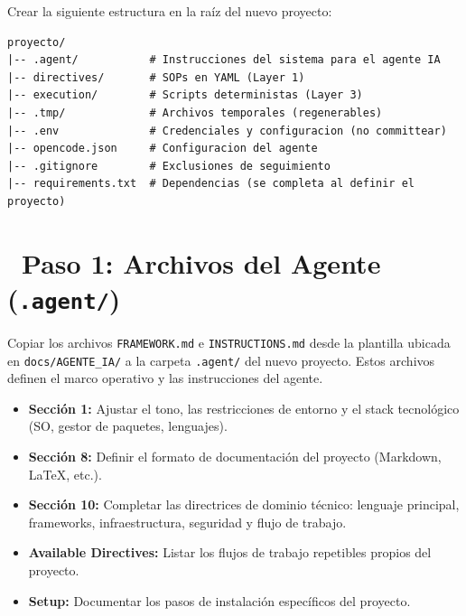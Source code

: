 \documentclass[11pt,a4paper]{article}
\newcommand{\iconotexto}[2]{\textcolor{cyanNeon}{\faIcon{#1}}~#2}
\begin{document}
Crear la siguiente estructura en la raíz del nuevo proyecto:

\begin{tcolorbox}[cajaContenido, title={Árbol de directorios}]
\begin{lstlisting}
proyecto/
|-- .agent/           # Instrucciones del sistema para el agente IA
|-- directives/       # SOPs en YAML (Layer 1)
|-- execution/        # Scripts deterministas (Layer 3)
|-- .tmp/             # Archivos temporales (regenerables)
|-- .env              # Credenciales y configuracion (no committear)
|-- opencode.json     # Configuracion del agente
|-- .gitignore        # Exclusiones de seguimiento
|-- requirements.txt  # Dependencias (se completa al definir el proyecto)
\end{lstlisting}
\end{tcolorbox}

\section[Paso 1 --- Archivos del Agente]{\iconotexto{cogs}{Paso 1: Archivos del Agente (\texttt{.agent/})}}

Copiar los archivos \texttt{FRAMEWORK.md} e \texttt{INSTRUCTIONS.md} desde la plantilla ubicada en \texttt{docs/AGENTE\_IA/} a la carpeta \texttt{.agent/} del nuevo proyecto. Estos archivos definen el marco operativo y las instrucciones del agente.

\begin{tcolorbox}[cajaContenido, title={Personalizar en \texttt{INSTRUCTIONS.md}}]
\begin{itemize}[leftmargin=*]
    \item \textbf{Sección 1:} Ajustar el tono, las restricciones de entorno y el stack tecnológico (SO, gestor de paquetes, lenguajes).
    \item \textbf{Sección 8:} Definir el formato de documentación del proyecto (Markdown, LaTeX, etc.).
    \item \textbf{Sección 10:} Completar las directrices de dominio técnico: lenguaje principal, frameworks, infraestructura, seguridad y flujo de trabajo.
\end{itemize}
\end{tcolorbox}

\begin{tcolorbox}[cajaContenido, title={Actualizar en \texttt{FRAMEWORK.md}}]
\begin{itemize}[leftmargin=*]
    \item \textbf{Available Directives:} Listar los flujos de trabajo repetibles propios del proyecto.
    \item \textbf{Setup:} Documentar los pasos de instalación específicos del proyecto.
\end{itemize}
\end{tcolorbox}
\end{document}
